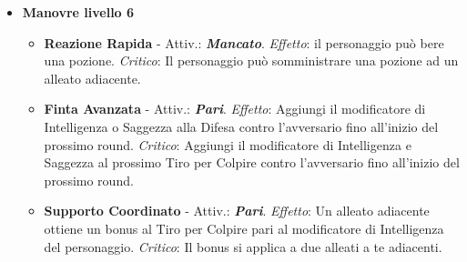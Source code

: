 \begin{multicols}{2}
\begin{itemize}[leftmargin=*]
\begin{itemize}[leftmargin=*]
		\item \textbf{Finta e Riposizionamento} - Attiv.: \textbf{\emph{Mancato}} con un \textbf{\emph{pari}}. \emph{Effetto}: Muovi 1 metro senza provocare attacchi di opportunità. \emph{Critico}: Come sopra ma di muovi 2 metri.

		\item \textbf{Colpo Distraente} - Attiv.: \textbf{\emph{Mancato}}. \emph{Effetto}: +1 alla Difesa contro l'avversario fino al fine del prossimo round. \emph{Critico}: L'avversario considera il personaggio come se avesse copertura leggera.

		\item \textbf{Intralcio Rapido} - Attiv.: \textbf{\emph{Mancato}} con un \textbf{\emph{dispari}}. \emph{Effetto}: L'avversario riduce di 1 metro il suo movimento nel prossimo round. \emph{Critico}: il prossimo movimento entro il prossimo round dell'avversario lo considera come terreno difficile.

		\item \textbf{Apertura Tattica} - Attiv.: \textbf{\emph{Mancato}} con un \textbf{\emph{pari}}. \emph{Effetto}: Un alleato ottiene +1 al prossimo Tiro per Colpire contro l'avversario. \emph{Critico}: L'alleato ottiene +2 al Tiro per Colpire.
	\end{itemize}

	\item \textbf{Manovre livello 6}
	\begin{itemize}[leftmargin=*]
		\setlength{\itemsep}{0pt}
		\item \textbf{Reazione Rapida} - Attiv.: \textbf{\emph{Mancato}}. \emph{Effetto}: il personaggio può bere una pozione. \emph{Critico}: Il personaggio può somministrare una pozione ad un alleato adiacente.

		\item \textbf{Finta Avanzata} - Attiv.: \textbf{\emph{Pari}}. \emph{Effetto}: Aggiungi il modificatore di Intelligenza o Saggezza alla Difesa contro l'avversario fino all'inizio del prossimo round. \emph{Critico}: Aggiungi il modificatore di Intelligenza e Saggezza al prossimo Tiro per Colpire contro l'avversario fino all'inizio del prossimo round.

		\item \textbf{Supporto Coordinato} - Attiv.: \textbf{\emph{Pari}}. \emph{Effetto}: Un alleato adiacente ottiene un bonus al Tiro per Colpire pari al modificatore di Intelligenza del personaggio. \emph{Critico}: Il bonus si applica a due alleati a te adiacenti.


\end{itemize}
\end{itemize}
\end{multicols}
